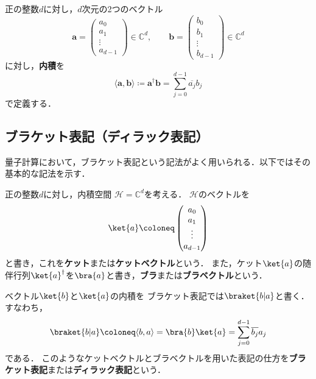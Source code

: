 \begin{samepage}
  \begin{defi}[内積]
    正の整数$d$に対し，$d$次元の2つのベクトル
    \begin{equation*}
      \bm{a}=\begin{pmatrix}a_0\\a_1\\\vdots\\a_{d-1}\end{pmatrix}
      \in\mathbb C^d,
      \qquad
      \bm{b}=\begin{pmatrix}b_0\\b_1\\\vdots\\b_{d-1}\end{pmatrix}
      \in\mathbb C^d
    \end{equation*}
    に対し，\textbf{内積}を
    \begin{equation*}
      \langle \bm{a},\bm{b}\rangle\coloneq \bm{a}^{\dagger}\bm{b}
      =\sum_{j=0}^{d-1}\overline{a_j}b_j
    \end{equation*}
    で定義する．
  \end{defi}
\end{samepage}

\subsection{ブラケット表記（ディラック表記）}

量子計算において，ブラケット表記という記法がよく用いられる．以下ではその基本的な記法を示す．

\begin{defi}
  正の整数$d$に対し，内積空間
  $\mathcal H=\mathbb C^d$を考える．
  $\mathcal H$のベクトルを
  \begin{equation*}
    \ket{a}
    \coloneq
    \begin{pmatrix}
      a_0 \\a_1\\\vdots\\a_{d-1}
    \end{pmatrix}
  \end{equation*}
  と書き，これを\textbf{ケット}または\textbf{ケットベクトル}という．
  また，ケット$\ket{a}$の随伴行列$\ket{a}^{\dagger}$を$\bra{a}$と書き，\textbf{ブラ}または\textbf{ブラベクトル}という．

  ベクトル$\ket{b}$と$\ket{a}$の内積を
  ブラケット表記では$\braket{b|a}$と書く．すなわち，
  \begin{equation*}
    \braket{b|a}\coloneq\langle b,a\rangle
    =\bra{b}\ket{a}
    =\sum_{j=0}^{d-1}\overline{b_j}a_j
  \end{equation*}
  である．
  このようなケットベクトルとブラベクトルを用いた表記の仕方を\textbf{ブラケット表記}または\textbf{ディラック表記}という．
\end{defi}

